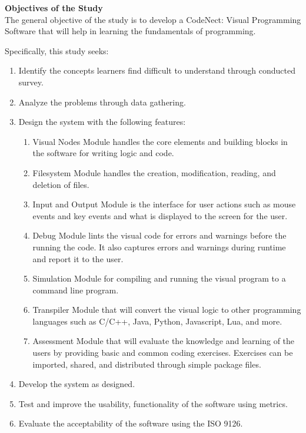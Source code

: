 \flushleft
\textbf{Objectives of the Study}\\
\justifying
\parx
The general objective of the study is to develop a CodeNect: Visual Programming
Software that will help in learning the fundamentals of programming.

\parx
Specifically, this study seeks:

\begin{enumerate}
	\item Identify the concepts learners find difficult to understand through conducted survey.
	\item Analyze the problems through data gathering.
	\item Design the system with the following features:
		\begin{enumerate}
			\item Visual Nodes Module handles the core elements and building blocks
				in the software for writing logic and code.
			\item Filesystem Module handles the creation, modification, reading, and
				deletion of files.
			\item Input and Output Module is the interface for user actions such as mouse
				events and key events and what is displayed to the screen for the user.
			\item Debug Module lints the visual code for errors and warnings before
				the running the code. It also captures errors and warnings during runtime
				and report it to the user.
			\item Simulation Module for compiling and running the visual program to
				a command line program.
			\item Transpiler Module that will convert the visual logic to other
				programming languages such as C/C++, Java, Python, Javascript, Lua, and
				more.
			\item Assessment Module that will evaluate the knowledge and learning of the
				users by providing basic and common coding exercises. Exercises can be
				imported, shared, and distributed through simple package files.
		\end{enumerate}

	\item Develop the system as designed.
	\item Test and improve the usability, functionality of the software using metrics.
	\item Evaluate the acceptability of the software using the ISO 9126. \\
\end{enumerate}
